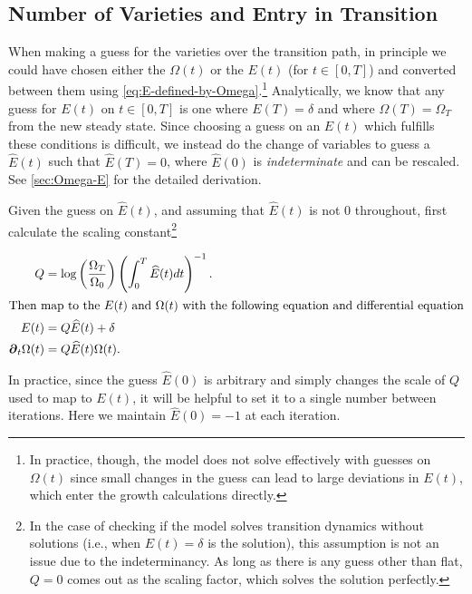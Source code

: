 \documentclass[11pt]{article}
\newcommand{\D}[1][]{\ensuremath{\boldsymbol{\partial}_{#1}}}
\begin{document}
\subsection{Number of Varieties and Entry in Transition}\label{sec:entry-ODE}


When making a guess for the varieties over the transition path, in principle we could have chosen either the $\Omega(t)$ or the $E(t)$ (for $t \in [0,T]$) and converted between them using \cref{eq:E-defined-by-Omega}.\footnote{In practice, though, the model does not solve effectively with guesses on $\Omega(t)$ since small changes in the guess can lead to large deviations in $E(t)$, which enter the growth calculations directly.}  Analytically, we know that any guess for $E(t)$ on $t \in [0,T]$ is one where $E(T) = \delta$ and where $\Omega(T) = \Omega_T$ from the new steady state.  Since choosing a guess on an $E(t)$ which fulfills these conditions is difficult, we instead do the change of variables to guess a $\widehat{E}(t)$ such that $\widehat{E}(T) = 0$, where $\widehat{E}(0)$ is \textit{indeterminate} and can be rescaled.  See \cref{sec:Omega-E} for the detailed derivation.

Given the guess on $\widehat{E}(t)$, and assuming that $\widehat{E}(t)$ is not $0$ throughout, first calculate the scaling constant\footnote{In the case of checking if the model solves transition dynamics without solutions (i.e., when $E(t) = \delta$ is the solution), this assumption is not an issue due to the indeterminancy.  As long as there is any guess other than flat, $Q = 0$ comes out as the scaling factor, which solves the solution perfectly.}

\begin{align}
	Q &= \log \left(\dfrac{\Omega_T}{\Omega_0}\right)\left(\int_0^T \widehat E(t) dt \right)^{-1} . \\
	\intertext{Then map to the $E(t)$ and $\Omega(t)$ with the following equation and differential equation}
	E(t) &= Q \widehat{E}(t) + \delta\\
	\D[t] \Omega(t) &= Q \widehat{E}(t) \Omega(t).
\end{align}

In practice, since the guess $\widehat{E}(0)$ is arbitrary and simply changes the scale of $Q$ used to map to $E(t)$, it will be helpful to set it to a single number between iterations.  Here we maintain $\widehat{E}(0) = - 1$ at each iteration.
\end{document}
